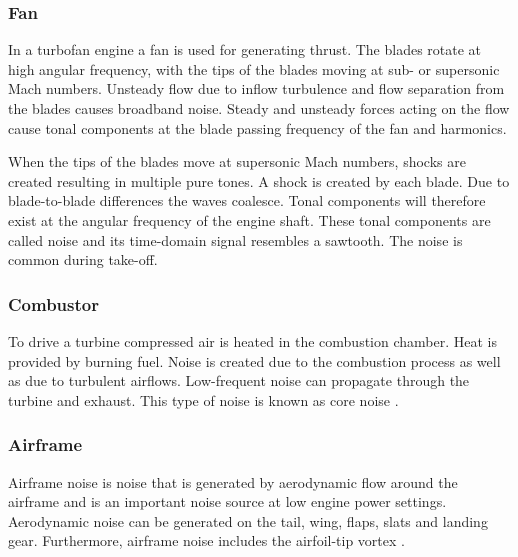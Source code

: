 \subsubsection{Fan}
In a turbofan engine a fan is used for generating thrust. The blades rotate at
high angular frequency, with the tips of the blades moving at sub- or supersonic
Mach numbers. Unsteady flow due to inflow turbulence and flow separation from
the blades causes broadband noise. Steady and unsteady forces acting on the flow
cause tonal components at the blade passing frequency of the fan and harmonics.

When the tips of the blades move at supersonic Mach numbers, shocks are created
resulting in multiple pure tones. A shock is created by each blade. Due to
blade-to-blade differences the waves coalesce. Tonal components will therefore
exist at the angular frequency of the engine shaft. These tonal components are
called  noise and its time-domain signal resembles a sawtooth.
The  noise is common during take-off.


\subsubsection{Combustor}
To drive a turbine compressed air is heated in the combustion chamber. Heat is
provided by burning fuel. Noise is created due to the combustion process as well
as due to turbulent airflows. Low-frequent noise can propagate through the
turbine and exhaust. This type of noise is known as core noise \cite{Zaporozhets2011}.


\subsubsection{Airframe}
Airframe noise is noise that is generated by aerodynamic flow around the
airframe and is an important noise source at low engine power settings.
Aerodynamic noise can be generated on the tail, wing, flaps, slats and landing gear.
Furthermore, airframe noise includes the airfoil-tip vortex \cite{Zaporozhets2011}.


